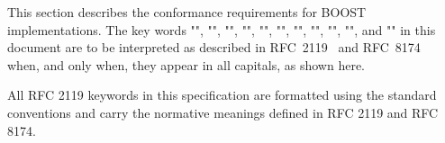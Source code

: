 
This section describes the conformance requirements for BOOST implementations. The key words "\MUST", "\MUSTNOT", "\REQUIRED", "\SHALL", "\SHALLNOT", "\SHOULD", "\SHOULDNOT", "\RECOMMENDED", "\NOTRECOMMENDED", "\MAY", and "\OPTIONAL" in this document are to be interpreted as described in RFC~2119~\cite{RFC2119} and RFC~8174~\cite{RFC8174} when, and only when, they appear in all capitals, as shown here.

\begin{normative}[title=RFC 2119 Keyword Interpretation]
All RFC 2119 keywords in this specification are formatted using the standard conventions and carry the normative meanings defined in RFC 2119 and RFC 8174.
\end{normative}